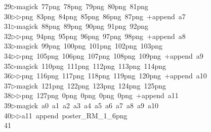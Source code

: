 \begin{tabbing}
29\>$\triangleright$\>magick\ 77png\ 78png\ 79png\ 80png\ 81png\ \\[0pt]
30\>$\triangleright$\>$\triangleright$png\ 83png\ 84png\ 85png\ 86png\ 87png\ +append\ a7\\[0pt]
31\>$\triangleright$\>magick\ 88png\ 89png\ 90png\ 91png\ 92png\ \\[0pt]
32\>$\triangleright$\>$\triangleright$png\ 94png\ 95png\ 96png\ 97png\ 98png\ +append\ a8\\[0pt]
33\>$\triangleright$\>magick\ 99png\ 100png\ 101png\ 102png\ 103png\ \\[0pt]
34\>$\triangleright$\>$\triangleright$png\ 105png\ 106png\ 107png\ 108png\ 109png\ +append\ a9\\[0pt]
35\>$\triangleright$\>magick\ 110png\ 111png\ 112png\ 113png\ 114png\ \\[0pt]
36\>$\triangleright$\>$\triangleright$png\ 116png\ 117png\ 118png\ 119png\ 120png\ +append\ a10\\[0pt]
37\>$\triangleright$\>magick\ 121png\ 122png\ 123png\ 124png\ 125png\ \\[0pt]
38\>$\triangleright$\>$\triangleright$png\ 127png\ 0png\ 0png\ 0png\ 0png\ +append\ a11\\[0pt]
39\>$\triangleright$\>magick\ a0\ a1\ a2\ a3\ a4\ a5\ a6\ a7\ a8\ a9\ a10\ \\[0pt]
40\>$\triangleright$\>$\triangleright$\>a11\ append\ poster\_RM\_1\_6png\\[0pt]
41\>\end{tabbing}
